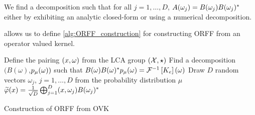 \begin{remark}
We find a decomposition such that for all $j=1, \ldots, D$, $A(\omega_j)=B(\omega_j)B(\omega_j)^* $ either by exhibiting an analytic closed-form or using a numerical decomposition.
\end{remark}
 allows us to define \cref{alg:ORFF_construction} for constructing \acs{ORFF} from an operator valued kernel.
\begin{center}
\begin{algorithm2e}[H]\label{alg:ORFF_construction}
	\SetAlgoLined
    \BlankLine
	Define the pairing $(x, \omega)$ from the \acs{LCA} group $(\mathcal{X}, \star)$\;
	Find a decomposition $(B(\omega)$,$p_{\mu}(\omega))$ such that $B(\omega)B(\omega)^* p_{\mu}(\omega)=\mathcal{F}^{-1}\left[K_e\right](\omega)$\;
	Draw $D$ random vectors $\omega_j$, $j=1, \hdots, D$ from the probability distribution $\mu$\;
   \Return $\tildePhi{1:D}(x)=\frac{1}{\sqrt{D}}\Vect_{j=1}^D\pairing{x, \omega_j}B(\omega_j)^\adjoint $\;
   \caption{Construction of \acs{ORFF} from \acs{OVK}}
   \label{al:ORFF_construction}
\end{algorithm2e}
\end{center}

